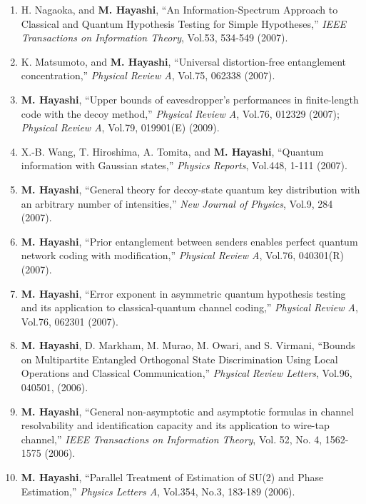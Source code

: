 \documentclass[a4paper,12pt,oneside]{article}
\begin{document}
\begin{enumerate}
\item
H. Nagaoka, and \textbf{M. Hayashi}, ``An Information-Spectrum Approach to Classical and Quantum Hypothesis Testing for Simple Hypotheses,'' 
{\em IEEE Transactions on Information Theory}, Vol.53, 534-549 (2007).

\item
K. Matsumoto, and \textbf{M. Hayashi}, ``Universal distortion-free entanglement concentration,'' 
{\em Physical Review A}, Vol.75, 062338 (2007).

\item 
\textbf{M. Hayashi}, ``Upper bounds of eavesdropper's performances in finite-length code with the decoy method,'' 
{\em Physical Review A}, Vol.76, 012329 (2007); 
{\em Physical Review A}, Vol.79, 019901(E) (2009).

\item
X.-B. Wang, T. Hiroshima, A. Tomita, and \textbf{M. Hayashi}, ``Quantum information with Gaussian states,'' 
{\em Physics Reports}, Vol.448, 1-111 (2007).

\item
\textbf{M. Hayashi}, ``General theory for decoy-state quantum key distribution with an arbitrary number of intensities,'' 
{\em New Journal of Physics}, Vol.9, 284 (2007).

\item
\textbf{M. Hayashi}, ``Prior entanglement between senders enables perfect quantum network coding with modification,'' 
{\em Physical Review A}, Vol.76, 040301(R) (2007).

\item
\textbf{M. Hayashi}, ``Error exponent in asymmetric quantum hypothesis testing and its application to classical-quantum channel coding,''
{\em Physical Review A}, Vol.76, 062301 (2007).

\item 
\textbf{M. Hayashi}, D. Markham, M. Murao, M. Owari, and S. Virmani, 
``Bounds on Multipartite Entangled Orthogonal State Discrimination Using Local Operations and Classical Communication,'' 
{\em Physical Review Letters}, Vol.96, 040501, (2006).

\item
\textbf{M. Hayashi}, ``General non-asymptotic and asymptotic formulas in channel resolvability and identification capacity and its application to wire-tap channel,'' 
{\em IEEE Transactions on Information Theory}, Vol. 52, No. 4, 1562-1575 (2006).

\item
\textbf{M. Hayashi}, ``Parallel Treatment of Estimation of SU(2) and Phase Estimation,'' 
{\em Physics Letters A}, Vol.354, No.3, 183-189 (2006).


\end{enumerate}
\end{document}
